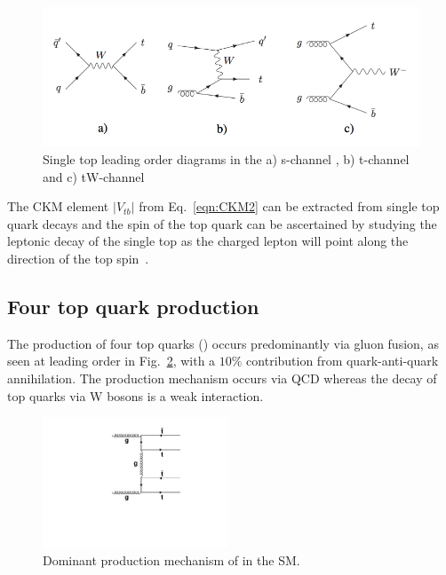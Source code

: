 \begin{figure}[ht!]
\begin{center}
    \includegraphics[width=\textwidth]{images/Theory/stFeyn.png}
    \caption{Single top leading order diagrams in the a) s-channel , b) t-channel and c) tW-channel~\cite{Lannon:2012fp}}
    \label{fig:stFeyn}
\end{center}
\end{figure}

The CKM element $|V_{tb}|$ from Eq.~\ref{eqn:CKM2} can be extracted from single top quark decays and the spin of the top quark can be ascertained by studying the leptonic decay of the single top as the charged lepton will point along the direction of the top spin~\cite{Boos:2012hi}.

\subsection{Four top quark production}

The production of four top quarks (\tttt) occurs predominantly via gluon fusion, as seen at leading order in Fig.~\ref{fig:ttttAtLO}, with a $10\%$ contribution from quark-anti-quark annihilation. The production mechanism occurs via QCD whereas the decay of top quarks via W bosons is a weak interaction. 

\begin{figure}[ht!]
\begin{center}
    \includegraphics[width=0.49\textwidth]{images/Theory/tttt_t_LO.pdf}
    \caption{Dominant production mechanism of \tttt in the SM.}
    \label{fig:ttttAtLO}
\end{center}
\end{figure}

